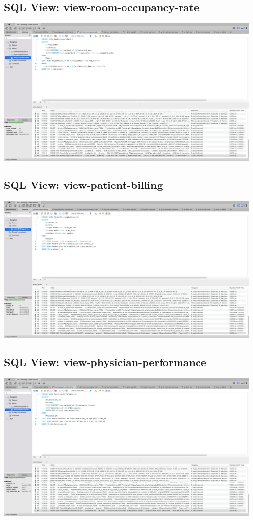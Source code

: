 \documentclass[a4paper,11pt]{article}
\theoremstyle{mytheor}
\begin{document}
\subsection{SQL View: view-room-occupancy-rate}
\includegraphics[width=\textwidth]{Screenshots/SCR-20240727-pgnv.png}

\subsection{SQL View: view-patient-billing}
\includegraphics[width=\textwidth]{Screenshots/SCR-20240727-pgiw.png}

\subsection{SQL View: view-physician-performance}
\includegraphics[width=\textwidth]{Screenshots/SCR-20240727-pglj.png}
\end{document}
